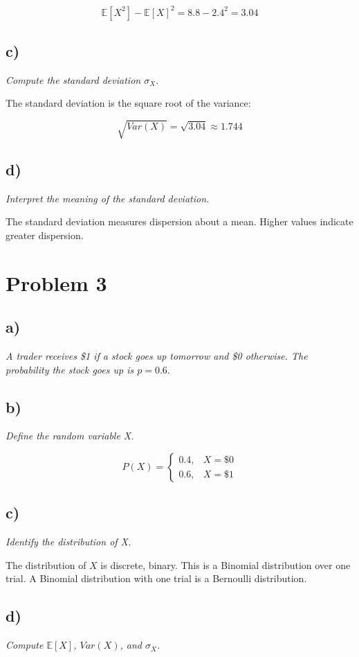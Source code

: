 \documentclass[11pt, oneside]{article}   	%
\begin{document}
$$
\mathbb{E}[X^2]-\mathbb{E}[X]^2 = 8.8 - 2.4^2 = 3.04
$$

\subsection*{c)}
\emph{Compute the standard deviation $\sigma_X$.}

The standard deviation is the square root of the variance: 

$$
\sqrt{Var(X)} = \sqrt{3.04} \approx 1.744
$$


\subsection*{d)}
\emph{Interpret the meaning of the standard deviation.}

The standard deviation measures dispersion about a mean. Higher values indicate greater dispersion.


\section*{Problem 3}
\subsection*{a)}
\emph{A trader receives \$1 if a stock goes up tomorrow and \$0 otherwise. The probability the stock goes up is $p = 0.6.$}

\subsection*{b)}
\emph{Define the random variable X.}

$$
P(X) = 
 \begin{cases} 
      0.4, & X = \$0 \\
      0.6, & X = \$1
   \end{cases}
$$

\subsection*{c)}
\emph{Identify the distribution of X.}

The distribution of $X$ is discrete, binary. This is a Binomial distribution over one trial. A Binomial distribution with one trial is a Bernoulli distribution.

\subsection*{d)}
\emph{Compute $\mathbb{E}[X]$, $Var(X)$, and $\sigma_{X}$.}
\end{document}
